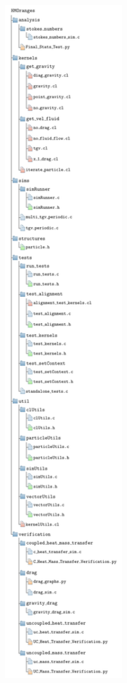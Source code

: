\documentclass[../Interim_Report_Master]{subfiles}
\begin{document}
\begin{figure}
	\centering
	\includegraphics*[width=0.5\textwidth, trim=0 290 0 330, clip]{./Diagrams/HMOranges_Structure/HMOranges_Structure.pdf}
\end{figure}
\end{document}
